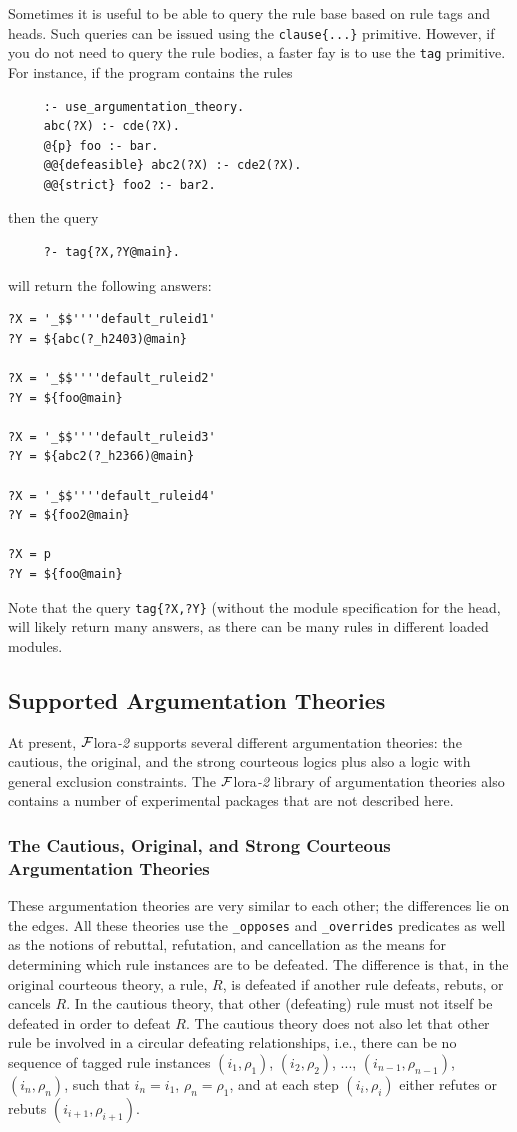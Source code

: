 \documentclass[11pt]{article}
\newcommand{\FLORA}{{\mbox{\sc ${\cal F}${lora}\rm\emph{-2}}}\xspace}
\begin{document}
Sometimes it is useful to be able to query the rule base based on rule
tags and heads. Such queries can be issued
using the {\tt clause\{...\}} primitive. However, 
if you do not need to query the rule bodies, a faster fay is to use the
{\tt tag}  primitive. For instance, if the program
contains the rules
\begin{verbatim}
     :- use_argumentation_theory.
     abc(?X) :- cde(?X).
     @{p} foo :- bar.
     @@{defeasible} abc2(?X) :- cde2(?X).
     @@{strict} foo2 :- bar2.
\end{verbatim}
then the query
\begin{verbatim}
     ?- tag{?X,?Y@main}.
\end{verbatim}
will return the following answers:
\begin{verbatim}
?X = '_$$''''default_ruleid1'
?Y = ${abc(?_h2403)@main}

?X = '_$$''''default_ruleid2'
?Y = ${foo@main}

?X = '_$$''''default_ruleid3'
?Y = ${abc2(?_h2366)@main}

?X = '_$$''''default_ruleid4'
?Y = ${foo2@main}

?X = p
?Y = ${foo@main}
\end{verbatim}
Note that the query \texttt{tag\{?X,?Y\}} (without the module specification
for the head, will likely return many answers, as there can be many rules
in different loaded modules. 


\subsection{Supported Argumentation Theories}\label{sec-exclusion-constr}

At present, \FLORA supports several different argumentation theories: the
cautious,
the original, and the strong courteous logics plus also a
logic with general exclusion constraints. The \FLORA library of
argumentation theories also contains a number of
experimental packages that are not described here.

\subsubsection{The Cautious, Original, and Strong Courteous Argumentation Theories}

These argumentation theories are very similar to each other; the
differences lie on the edges. All these theories use the {\tt \_opposes} and
{\tt \_overrides} predicates as well as the notions of rebuttal,
refutation, and cancellation as the means for determining which rule
instances are to be defeated. The difference is that, in the original courteous
theory, a rule, $R$, is defeated if another rule defeats, rebuts, or
cancels $R$.
In the cautious theory, that other (defeating)
rule must not itself be defeated in order to
defeat $R$. The cautious theory does not also let that other rule be
involved in a circular defeating relationships,
i.e., there can be no sequence of
  tagged rule instances $(i_1,\rho_1)$, $(i_2,\rho_2)$, ...,
  $(i_{n-1},\rho_{n-1})$, $(i_n,\rho_n)$, such that $i_n=i_1$,
  $\rho_n=\rho_1$, and at each step $(i_i,\rho_i)$ either refutes or rebuts
  $(i_{i+1},\rho_{i+1})$.
\end{document}

